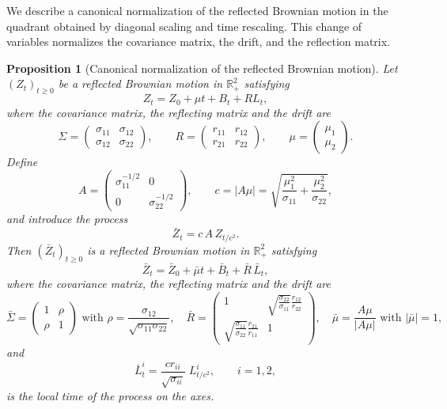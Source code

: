 \documentclass[11pt]{article}
\newtheorem{prop}[thm]{Proposition}
\theoremstyle{definition}
\begin{document}
We describe a canonical normalization of the reflected Brownian motion in the quadrant obtained by diagonal scaling and time rescaling. This change of variables normalizes the covariance matrix, the drift, and the reflection matrix.



\begin{prop}[Canonical normalization of the reflected Brownian motion]
Let $(Z_t)_{t\ge 0}$ be a reflected Brownian motion in $\mathbb{R}_+^2$ satisfying
\[
Z_t = Z_0 + \mu t + B_t + R L_t,
\]
where the covariance matrix, the reflecting matrix and the drift are
\[
\Sigma =
\begin{pmatrix}
\sigma_{11} & \sigma_{12}\\
\sigma_{12} & \sigma_{22}
\end{pmatrix},
\qquad
R =
\begin{pmatrix}
r_{11} & r_{12}\\
r_{21} & r_{22}
\end{pmatrix},
\qquad
\mu= \begin{pmatrix}
\mu_1 \\
\mu_2 
\end{pmatrix}.
\]
Define
\begin{equation}
A =
\begin{pmatrix}
\sigma_{11}^{-1/2} & 0\\
0 & \sigma_{22}^{-1/2}
\end{pmatrix},
\qquad
c = |A\mu|= \sqrt{
\frac{\mu_1^2}{\sigma_{11}} + \frac{\mu_2^2}{\sigma_{22}}
},
\label{eq:Ac}
\end{equation}
and introduce the process
\[
\bar Z_t = c\, A\, Z_{t/c^2}.
\]
Then $(\bar Z_t)_{t\ge 0}$ is a reflected Brownian motion in $\mathbb{R}_+^2$ satisfying
\[
\bar Z_t = \bar Z_0 + \bar\mu t + \bar B_t + \bar R\, \bar L_t,
\]
where the covariance matrix, the reflecting matrix and the drift are
\[
\bar\Sigma =
\begin{pmatrix}
1 & \rho\\
\rho & 1
\end{pmatrix}
\text{ with }
\rho = \frac{\sigma_{12}}{\sqrt{\sigma_{11}\sigma_{22}}},
\quad
\bar R =
\begin{pmatrix}
1 &
\sqrt{\frac{\sigma_{22}}{\sigma_{11}}} \frac{ r_{12}}{r_{22}}\\[1em]
\sqrt{\frac{\sigma_{11}}{\sigma_{22}}} \frac{ r_{21}}{r_{11}} &
1
\end{pmatrix},
\quad
\bar\mu = \frac{A\mu}{|A\mu|}
\text{ with }
|\bar\mu|=1,
\]
and
\[
\bar L_t^i = \frac{cr_{ii} }{\sqrt{\sigma_{ii}}}\; L_{t/c^2}^i,
\qquad i=1,2,
\]
is the local time of the process on the axes.
\end{prop}
\end{document}
